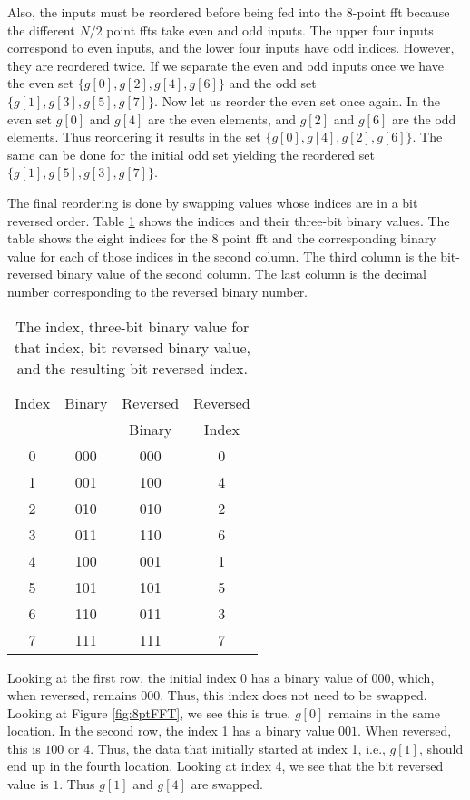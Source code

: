 Also, the inputs must be reordered before being fed into the 8-point \gls{fft} because the different $N/2$ point \gls{fft}s take even and odd inputs. The upper four inputs correspond to even inputs, and the lower four inputs have odd indices. However, they are reordered twice. If we separate the even and odd inputs once we have the even set $\{g[0], g[2], g[4], g[6] \}$ and the odd set $\{g[1], g[3], g[5], g[7] \}$. Now let us reorder the even set once again. In the even set $g[0]$ and $g[4]$ are the even elements, and $g[2]$ and $g[6]$ are the odd elements. Thus reordering it results in the set $\{g[0], g[4], g[2], g[6] \}$. The same can be done for the initial odd set yielding the reordered set $\{g[1], g[5], g[3], g[7] \}$. 

The final reordering is done by swapping values whose indices are in a bit reversed order. Table \ref{table:bit_reverse} shows the indices and their three-bit binary values. The table shows the eight indices for the 8 point \gls{fft} and the corresponding binary value for each of those indices in the second column. The third column is the bit-reversed binary value of the second column. The last column is the decimal number corresponding to the reversed binary number. 

\begin{table}[htbp]
\caption{The index, three-bit binary value for that index, bit reversed binary value, and the resulting bit reversed index.}
\begin{center}
\begin{tabular}{|c|c|c|c|}
\hline
Index & Binary & Reversed & Reversed \\
 & & Binary & Index \\
\hline
0 & 000 & 000 & 0 \\
1 & 001 & 100 & 4 \\
2 & 010 & 010 & 2 \\
3 & 011 & 110 & 6 \\
4 & 100 & 001 & 1 \\
5 & 101 & 101 & 5 \\
6 & 110 & 011 & 3 \\
7 & 111 & 111 & 7 \\
\hline
\end{tabular}
\end{center}
\label{table:bit_reverse}
\end{table}

Looking at the first row, the initial index $0$ has a binary value of $000$, which, when reversed, remains $000$. Thus, this index does not need to be swapped. Looking at Figure \ref{fig:8ptFFT}, we see this is true. $g[0]$ remains in the same location. In the second row, the index 1 has a binary value $001$. When reversed, this is $100$ or $4$. Thus, the data that initially started at index 1, i.e., $g[1]$, should end up in the fourth location. Looking at index 4, we see that the bit reversed value is $1$. Thus $g[1]$ and $g[4]$ are swapped.  

